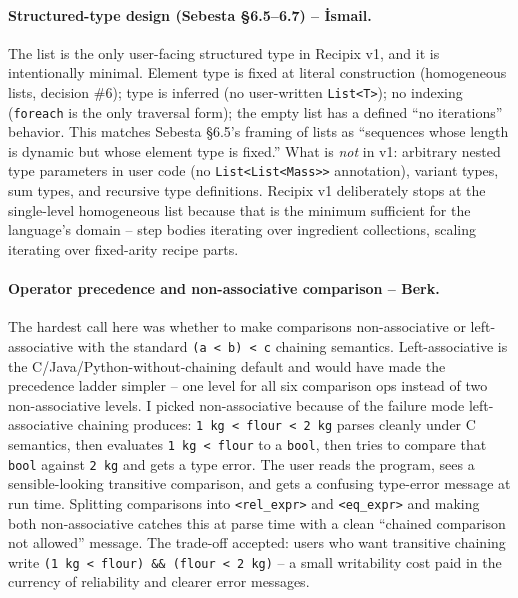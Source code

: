 \documentclass[11pt,a4paper]{article}
\begin{document}
\paragraph{Structured-type design (Sebesta \S6.5--6.7) -- İsmail.}
The list is the only user-facing structured type in Recipix v1, and it
is intentionally minimal. Element type is fixed at literal construction
(homogeneous lists, decision \#6); type is inferred (no user-written
\texttt{List<T>}); no indexing (\texttt{foreach} is the only traversal
form); the empty list has a defined ``no iterations'' behavior. This
matches Sebesta \S6.5's framing of lists as ``sequences whose
length is dynamic but whose element type is fixed.'' What is
\emph{not} in v1: arbitrary nested type parameters in user code (no
\texttt{List<List<Mass>>} annotation), variant types, sum types, and
recursive type definitions. Recipix v1 deliberately stops at the
single-level homogeneous list because that is the minimum sufficient
for the language's domain -- step bodies iterating over ingredient
collections, scaling iterating over fixed-arity recipe parts.

\paragraph{Operator precedence and non-associative comparison -- Berk.}
The hardest call here was whether to make comparisons non-associative
or left-associative with the standard \texttt{(a < b) < c} chaining
semantics. Left-associative is the C/Java/Python-without-chaining
default and would have made the precedence ladder simpler -- one level
for all six comparison ops instead of two non-associative levels. I
picked non-associative because of the failure mode left-associative
chaining produces: \texttt{1 kg < flour < 2 kg} parses cleanly under C
semantics, then evaluates \texttt{1 kg < flour} to a \texttt{bool},
then tries to compare that \texttt{bool} against \texttt{2 kg} and gets
a type error. The user reads the program, sees a sensible-looking
transitive comparison, and gets a confusing type-error message at
run time. Splitting comparisons into \texttt{<rel\_expr>} and
\texttt{<eq\_expr>} and making both non-associative catches this at
parse time with a clean ``chained comparison not allowed'' message.
The trade-off accepted: users who want transitive chaining write
\texttt{(1 kg < flour) \&\& (flour < 2 kg)} -- a small writability
cost paid in the currency of reliability and clearer error messages.
\end{document}
